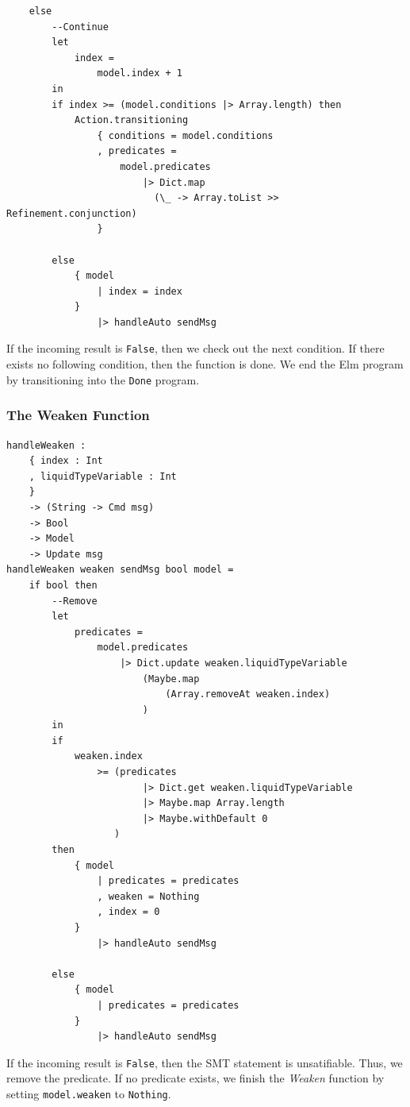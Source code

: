 \documentclass[]{scrbook}
\theoremstyle{definition}
\theoremstyle{definition}
\theoremstyle{definition}
\theoremstyle{remark}
\begin{document}
\text{\textemdash}

\begin{verbatim}
    else
        --Continue
        let
            index =
                model.index + 1
        in
        if index >= (model.conditions |> Array.length) then
            Action.transitioning
                { conditions = model.conditions
                , predicates =
                    model.predicates
                        |> Dict.map 
                          (\_ -> Array.toList >> Refinement.conjunction)
                }

        else
            { model
                | index = index
            }
                |> handleAuto sendMsg
\end{verbatim}

If the incoming result is \texttt{False}, then we check out the next
condition. If there exists no following condition, then the function is
done. We end the Elm program by transitioning into the \texttt{Done}
program.

\subsubsection{The Weaken Function}\label{the-weaken-function}

\begin{verbatim}
handleWeaken :
    { index : Int
    , liquidTypeVariable : Int
    }
    -> (String -> Cmd msg)
    -> Bool
    -> Model
    -> Update msg
handleWeaken weaken sendMsg bool model =
    if bool then
        --Remove
        let
            predicates =
                model.predicates
                    |> Dict.update weaken.liquidTypeVariable
                        (Maybe.map
                            (Array.removeAt weaken.index)
                        )
        in
        if
            weaken.index
                >= (predicates
                        |> Dict.get weaken.liquidTypeVariable
                        |> Maybe.map Array.length
                        |> Maybe.withDefault 0
                   )
        then
            { model
                | predicates = predicates
                , weaken = Nothing
                , index = 0
            }
                |> handleAuto sendMsg

        else
            { model
                | predicates = predicates
            }
                |> handleAuto sendMsg
\end{verbatim}

If the incoming result is \texttt{False}, then the SMT statement is
unsatifiable. Thus, we remove the predicate. If no predicate exists, we
finish the \emph{Weaken} function by setting \texttt{model.weaken} to
\texttt{Nothing}.
\end{document}
